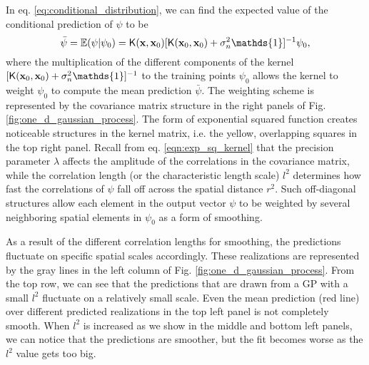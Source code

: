 In eq. \ref{eq:conditional_distribution}, 
we can find the expected value of the conditional prediction of $\psi$ to be 
\begin{equation}
	\bar{\psi} = \mathbb{E}(\psi | \psi_0) = \kerngp(\xv, \xv_0)[\kerngp(\xv_0, \xv_0) +
	\sigma_n^2 \mathds{1}]^{-1}\psi_0, 
\end{equation}
where the multiplication of the different
components of the kernel $ [\kerngp(\xv_0, \xv_0) +
	\sigma_n^2 \mathds{1}]^{-1}$ to
the training points $\psi_0$ allows the kernel to weight $\psi_0$ to compute
the mean prediction $\bar{\psi}$. 
The weighting scheme is represented by the covariance matrix structure in the
right panels of Fig. \ref{fig:one_d_gaussian_process}.
The form of exponential squared function creates noticeable structures in the
kernel matrix, i.e. the yellow,
overlapping squares in the top right panel. 
Recall from eq. \ref{eqn:exp_sq_kernel} that 
the precision parameter $\lambda$ affects the 
amplitude of the correlations in the covariance matrix, while the correlation length (or
the characteristic length scale) $l^2$ 
determines how fast the correlations of  $\psi$ 
fall off across the spatial distance $r^2$. 
Such off-diagonal structures allow each element in the output vector $\psi$ to be weighted by
several neighboring spatial elements in $\psi_0$ as a form of smoothing.

As a result of the different correlation lengths for smoothing, 
the predictions fluctuate on specific spatial scales accordingly.
These realizations are represented by the gray lines in the left column of Fig.
\ref{fig:one_d_gaussian_process}. From the top row, we can see that 
the predictions that are drawn from a GP with a small $l^2$ 
fluctuate on a relatively small scale. Even the mean prediction (red line) over
different predicted realizations in the top
left panel is not completely smooth. When $l^2$ is increased as we show in the
middle and bottom left panels, we can notice that the predictions are
smoother, but the fit becomes worse as the $l^2$ value gets too big. 

